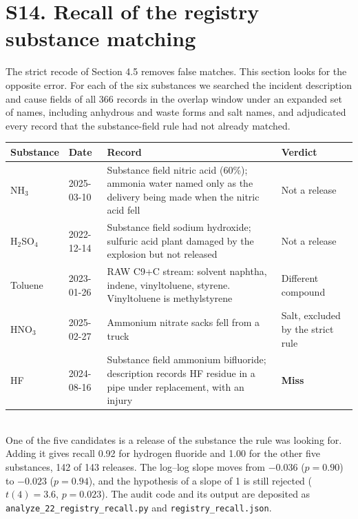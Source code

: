 \documentclass[11pt]{article}
\begin{document}
\section*{S14. Recall of the registry substance matching}
The strict recode of Section 4.5 removes false matches. This section looks for the opposite error. For each of the six substances we searched the incident description and cause fields of all 366 records in the overlap window under an expanded set of names, including anhydrous and waste forms and salt names, and adjudicated every record that the substance-field rule had not already matched.\\[4pt]
{\small\setlength{\tabcolsep}{4pt}\begin{tabular}{llp{6.5cm}p{1.9cm}}\toprule Substance & Date & Record & Verdict \\\midrule
NH$_3$ & 2025-03-10 & Substance field nitric acid (60\%); ammonia water named only as the delivery being made when the nitric acid fell & Not a release \\
H$_2$SO$_4$ & 2022-12-14 & Substance field sodium hydroxide; sulfuric acid plant damaged by the explosion but not released & Not a release \\
Toluene & 2023-01-26 & RAW C9+C stream: solvent naphtha, indene, vinyltoluene, styrene. Vinyltoluene is methylstyrene & Different compound \\
HNO$_3$ & 2025-02-27 & Ammonium nitrate sacks fell from a truck & Salt, excluded by the strict rule \\
HF & 2024-08-16 & Substance field ammonium bifluoride; description records HF residue in a pipe under replacement, with an injury & \textbf{Miss} \\
\bottomrule\end{tabular}}\\[6pt]
One of the five candidates is a release of the substance the rule was looking for. Adding it gives recall 0.92 for hydrogen fluoride and 1.00 for the other five substances, 142 of 143 releases. The log--log slope moves from $-0.036$ ($p = 0.90$) to $-0.023$ ($p = 0.94$), and the hypothesis of a slope of 1 is still rejected ($t(4) = 3.6$, $p = 0.023$). The audit code and its output are deposited as \texttt{analyze\_22\_registry\_recall.py} and \texttt{registry\_recall.json}.
\end{document}

